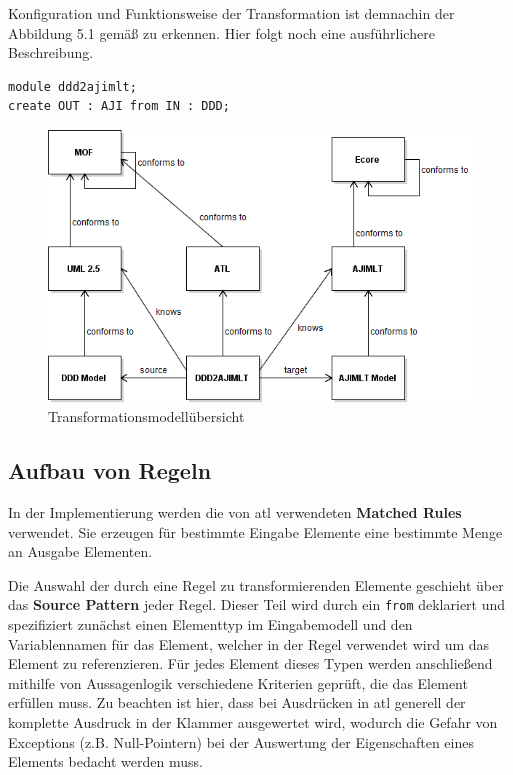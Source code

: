 \documentclass[
	oneside,  %
	ngerman, 
	final, 
	11pt, 
	a4paper, 
	1.1headlines, 
	headinclude=false, 
	footinclude=false, 
	mpinclude=false, 
	pagesize, 
	onecolumn, 
	titlepage, 
	parskip=half, 
	headsepline, 
	chapterprefix=false, 
	version=first, 
	listof=totoc, 
	bibliography=totoc, 
	toc=graduated, 
	fleqn
]{scrbook}
\begin{document}
Konfiguration und Funktionsweise der Transformation ist demnachin der Abbildung 5.1 gemäß \cite{transformationModels} zu erkennen. Hier folgt noch eine ausführlichere Beschreibung.
\begin{lstlisting}[caption={Kopf des ATL Moduls},captionpos=b,label=Quellcode:ModuleKopf] 
module ddd2ajimlt;
create OUT : AJI from IN : DDD;
\end{lstlisting}
\begin{figure}
\includegraphics[width=\textwidth]{Bilder/transformationModelOverview.png}
\caption{Transformationsmodellübersicht}
\end{figure}
\subsection{Aufbau von Regeln}
In der Implementierung werden die von \ac{atl} verwendeten \textbf{Matched Rules} verwendet. Sie erzeugen für bestimmte Eingabe Elemente eine bestimmte Menge an Ausgabe Elementen. 

Die Auswahl der durch eine Regel zu transformierenden Elemente geschieht über das \textbf{Source Pattern} jeder Regel. Dieser Teil wird durch ein \texttt{from} deklariert und spezifiziert zunächst einen Elementtyp im Eingabemodell und den Variablennamen für das Element, welcher in der Regel verwendet wird um das Element zu referenzieren. Für jedes Element dieses Typen werden anschließend mithilfe von Aussagenlogik verschiedene Kriterien geprüft, die das Element erfüllen muss. Zu beachten ist hier, dass bei Ausdrücken in \ac{atl} generell der komplette Ausdruck in der Klammer ausgewertet wird, wodurch die Gefahr von Exceptions (z.B. Null-Pointern) bei der Auswertung der Eigenschaften eines Elements bedacht werden muss. 
\end{document}
